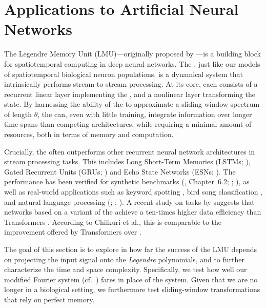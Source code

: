 
\section{Applications to Artificial Neural Networks}
\label{sec:applications_to_ml}

The Legendre Memory Unit (LMU)---originally proposed by \citet{voelker2019lmu}---is a building block for spatiotemporal computing in deep neural networks.
The \LMU, just like our models of spatiotemporal biological neuron populations, is a dynamical system that intrinsically performs stream-to-stream processing.
At its core, each \LMU consists of a recurrent linear layer implementing the \LDN, and a nonlinear layer transforming the \LDN state.
By harnessing the ability of the \LDN to approximate a sliding window spectrum of length $\theta$, the \LMU can, even with little training, integrate information over longer time-spans than competing architectures, while requiring a minimal amount of resources, both in terms of memory and computation.

Crucially, the \LMU often outperforms other recurrent neural network architectures in stream processing tasks.
This includes Long Short-Term Memories (LSTMs; \cite{hochreiter1997long}), Gated Recurrent Units (GRUs; \cite{chung2014empirical}) and Echo State Networks (ESNs; \cite{jaeger2004harnessing}).
The \LMU performance has been verified for synthetic benchmarks (\cite{voelker2019}, Chapter~6.2; \cite{voelker2019lmu}; \cite{gu2020hippo}), as well as real-world applications such as keyword spotting \citep{blouw2021hardware}, bird song classification \citep{gupta2021comparing}, and natural language processing (\NLP; \cite{chilkuri2021parallelizinga}; \cite{chilkuri2021parallelizing}).
A recent study on \NLP tasks by \citet{chilkuri2021language} suggests that networks based on a variant of the \LMU achieve a ten-times higher data efficiency than Transformers \citep{vaswani2017attention}.
According to Chilkuri et al., this is comparable to the improvement offered by Transformers over \LSTMpl.

The goal of this section is to explore in how far the success of the LMU depends on projecting the input signal onto the \emph{Legendre} polynomials, and to further characterize the \LMU time and space complexity.
Specifically, we test how well our modified Fourier system (cf.~) fares in place of the \LDN system.
Given that we are no longer in a biological setting, we furthermore test sliding-window transformations that rely on perfect memory.

